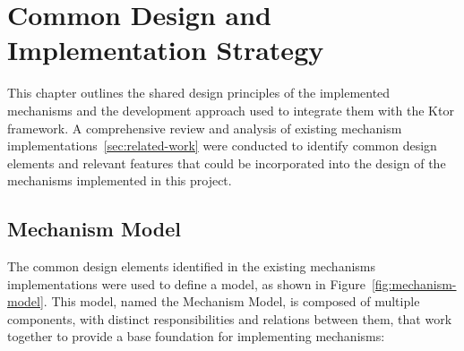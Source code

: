 \chapter{Common Design and Implementation Strategy}\label{ch:design-implementation}

This chapter outlines the shared design principles of the implemented mechanisms and the development approach
used to integrate them with the Ktor framework.
A comprehensive review and analysis of existing mechanism implementations~\ref{sec:related-work} were conducted
to identify common design elements and relevant features that could be incorporated into the design of the mechanisms implemented in this project.


\section{Mechanism Model}\label{sec:mechanism-model}

The common design elements identified in the existing mechanisms implementations were used
to define a model, as shown in Figure~\ref{fig:mechanism-model}.
This model, named the Mechanism Model, is composed of multiple components, with distinct responsibilities and relations between them, that work together to provide a base foundation for implementing mechanisms:

